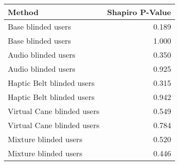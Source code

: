 
\centering
\begin{tabular}{lr}
\toprule
                    Method &  Shapiro P-Value \\
\midrule
        Base blinded users &            0.189 \\
        Base blinded users &            1.000 \\
       Audio blinded users &            0.350 \\
       Audio blinded users &            0.925 \\
 Haptic Belt blinded users &            0.315 \\
 Haptic Belt blinded users &            0.942 \\
Virtual Cane blinded users &            0.549 \\
Virtual Cane blinded users &            0.784 \\
     Mixture blinded users &            0.520 \\
     Mixture blinded users &            0.446 \\
\bottomrule
\end{tabular}
